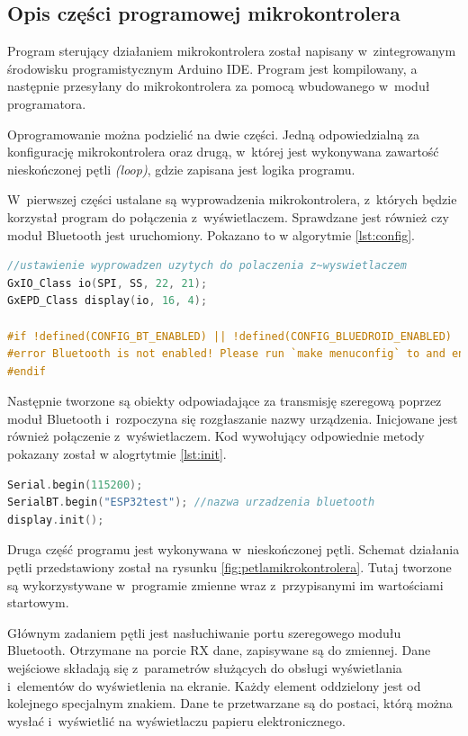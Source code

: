 \documentclass[a4paper,12pt, twoside]{article}
\begin{document}
        \subsection{Opis części programowej mikrokontrolera}
    	Program sterujący działaniem mikrokontrolera został napisany w~zintegrowanym środowisku programistycznym Arduino IDE. Program jest kompilowany, a następnie przesyłany do mikrokontrolera za pomocą wbudowanego w~moduł programatora.

        Oprogramowanie można podzielić na dwie części. Jedną odpowiedzialną za konfigurację mikrokontrolera oraz drugą, w~której jest wykonywana zawartość nieskończonej pętli \textit{(loop)}, gdzie zapisana jest logika programu.
        
        W~pierwszej części ustalane są wyprowadzenia mikrokontrolera, z~których będzie korzystał program do połączenia z~wyświetlaczem. Sprawdzane jest również czy moduł Bluetooth jest uruchomiony. Pokazano to w algorytmie \ref{lst:config}.
        \begin{lstlisting}[language=C++, caption=Konfiguracja wykorzystanych modułów, label={lst:config}]
//ustawienie wyprowadzen uzytych do polaczenia z~wyswietlaczem
GxIO_Class io(SPI, SS, 22, 21);
GxEPD_Class display(io, 16, 4);

#if !defined(CONFIG_BT_ENABLED) || !defined(CONFIG_BLUEDROID_ENABLED)
#error Bluetooth is not enabled! Please run `make menuconfig` to and enable it
#endif
\end{lstlisting}

        Następnie tworzone są obiekty odpowiadające za transmisję szeregową poprzez moduł Bluetooth i~rozpoczyna się rozgłaszanie nazwy urządzenia. Inicjowane jest również połączenie z~wyświetlaczem. Kod wywołujący odpowiednie metody pokazany został w  alogrtytmie \ref{lst:init}.
        \begin{lstlisting}[language=C++, caption=Inicjalizacja wyświetlacza i transmisji szeregowej, label={lst:init}]
Serial.begin(115200);
SerialBT.begin("ESP32test"); //nazwa urzadzenia bluetooth
display.init();
\end{lstlisting}

    	Druga część programu jest wykonywana w~nieskończonej pętli. Schemat działania pętli przedstawiony został na rysunku \ref{fig:petlamikrokontrolera}. Tutaj tworzone są wykorzystywane w~programie zmienne wraz z~przypisanymi im wartościami startowym.
    	
    	Głównym zadaniem pętli jest nasłuchiwanie portu szeregowego modułu Bluetooth. Otrzymane na porcie RX dane, zapisywane są do zmiennej. Dane wejściowe składają się z~parametrów służących do obsługi wyświetlania i~elementów do wyświetlenia na ekranie. Każdy element oddzielony jest od kolejnego specjalnym znakiem. Dane te przetwarzane są do postaci, którą można wysłać i~wyświetlić na wyświetlaczu papieru elektronicznego. 
    	
\end{document}

